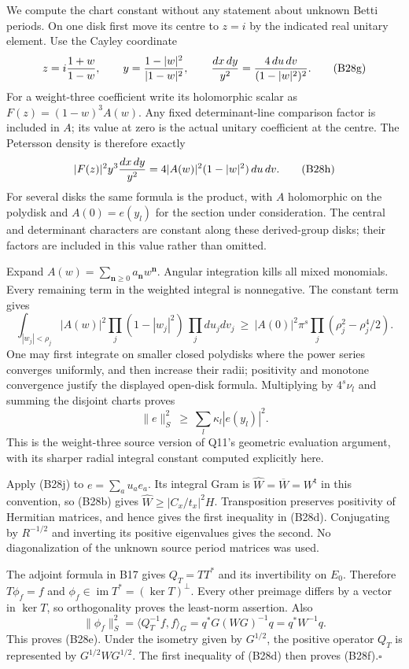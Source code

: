 \documentclass[11pt]{article}
\theoremstyle{definition}\newtheorem{definition}[theorem]{Definition}\newtheorem{remark}[theorem]{Remark}
\begin{document}
We compute the chart constant without any statement about
unknown Betti periods.  On one disk first move its centre to
$z=i$ by the indicated real unitary element.  Use the Cayley
coordinate
\[
 z=i{1+w\over1-w},\qquad
 y={1-|w|^2\over|1-w|^2},\qquad
 {dx\,dy\over y^2}={4\,du\,dv\over(1-|w|^2)^2}.
 \tag{B28g}
\]
For a weight-three coefficient write its holomorphic scalar
as $F(z)=(1-w)^3A(w)$.  Any fixed determinant-line comparison
factor is included in $A$; its value at zero is the actual
unitary coefficient at the centre.  The Petersson density is
therefore exactly
\[
       |F(z)|^2y^3{dx\,dy\over y^2}
               =4|A(w)|^2(1-|w|^2)\,du\,dv.
 \tag{B28h}
\]
For several disks the same formula is the product, with
$A$ holomorphic on the polydisk and $A(0)=e(y_l)$ for the
section under consideration.  The central and determinant
characters are constant along these derived-group disks;
their factors are included in this value rather than omitted.

Expand $A(w)=\sum_{\mathbf n\geq0}a_{\mathbf n}w^{\mathbf n}$.
Angular integration kills all mixed monomials.  Every
remaining term in the weighted integral is nonnegative.
The constant term gives
\[
 \int_{|w_j|<\rho_j}|A(w)|^2
                \prod_j(1-|w_j|^2)\,\prod_jdu_jdv_j
 \ \geq\ |A(0)|^2\pi^s
                  \prod_j(\rho_j^2-\rho_j^4/2).
 \tag{B28i}
\]
One may first integrate on smaller closed polydisks where
the power series converges uniformly, and then increase
their radii; positivity and monotone convergence justify
the displayed open-disk formula.  Multiplying by $4^s\nu_l$
and summing the disjoint charts proves
\[
       \|e\|_S^2\ \geq\ \sum_l\kappa_l|e(y_l)|^2.
 \tag{B28j}
\]
This is the weight-three source version of Q11's geometric
evaluation argument, with its sharper radial integral
constant computed explicitly here.

Apply (B28j) to $e=\sum_a u_ae_a$.  Its integral Gram is
$\widehat W=\overline W=W^{\mathsf t}$ in this convention,
so (B28b) gives
$\widehat W\geq|C_x/t_x|^2H$.
Transposition preserves positivity of Hermitian matrices,
and hence gives the first inequality in (B28d).  Conjugating
by $R^{-1/2}$ and inverting its positive eigenvalues gives
the second.  No diagonalization of the unknown source
period matrices was used.

The adjoint formula in B17 gives $Q_T=TT^*$ and its
invertibility on $E_0$.  Therefore $T\phi_f=f$ and
$\phi_f\in\operatorname{im}T^*=(\ker T)^\perp$.
Every other preimage differs by a vector in $\ker T$,
so orthogonality proves the least-norm assertion.  Also
\[
 \|\phi_f\|_S^2
   =\langle Q_T^{-1}f,f\rangle_G
   =q^*G(WG)^{-1}q=q^*W^{-1}q.
\]
This proves (B28e).  Under the isometry given by $G^{1/2}$,
the positive operator $Q_T$ is represented by
$G^{1/2}WG^{1/2}$.  The first inequality of (B28d)
then proves (B28f).\hfill$\square$
\end{document}
